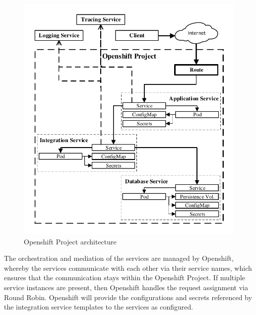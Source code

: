 \begin{figure}[htbp]
	\centering
	\includegraphics[scale=1]{images/esboc-design-openshift.pdf}
	\caption{Openshift Project architecture}
	\label{fig:esboc-design-openshift-project}
\end{figure} 

The orchestration and mediation of the services are managed by Openshift, whereby the services communicate with each other via their service names, which ensures that the communication stays within the Openshift Project. If multiple service instances are present, then Openshift handles the request assignment via Round Robin. Openshift will provide the configurations and secrets referenced by the integration service templates to the services as configured.

